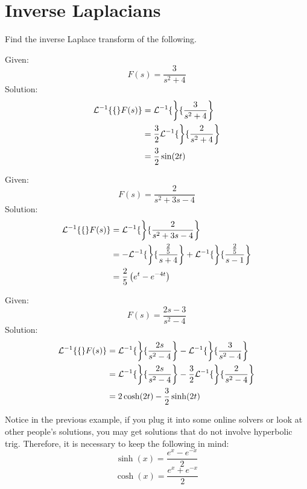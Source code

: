 \documentclass[diffeq.tex]{subfiles}
\begin{document}
\section{Inverse Laplacians}
Find the inverse Laplace transform of the following.
\begin{homework*}[255.1]
    Given:
    \begin{equation}
        F(s) = \frac{3}{s^{2} + 4}
    \end{equation}
    Solution:
    \begin{alignat}{1}
        \mathcal{L}^{-1}\{\{\}F(s)\} &= \mathcal{L}^{-1}\{\left\}\{\frac{3}{s^{2} + 4}\right\}\\
        &= \frac{3}{2}\mathcal{L}^{-1}\{\left\}\{\frac{2}{s^{2} + 4}\right\}\\
        &= \frac{3}{2}\sin(2t)
    \end{alignat}
\end{homework*}
\begin{homework*}[255.3]
    Given:
    \begin{equation}
        F(s) = \frac{2}{s^{2} + 3s - 4}
    \end{equation}
    Solution:
    \begin{alignat}{1}
        \mathcal{L}^{-1}\{\{\}F(s)\} &= \mathcal{L}^{-1}\{\left\}\{\frac{2}{s^{2} + 3s - 4}\right\}\\
        &= -\mathcal{L}^{-1}\{\left\}\{\frac{\frac{2}{5}}{s + 4}\right\} + \mathcal{L}^{-1}\{\left\}\{\frac{\frac{2}{5}}{s - 1}\right\}\\
        &= \frac{2}{5}\left(e^{t}-e^{-4t}\right)
    \end{alignat}
\end{homework*}
\begin{homework*}[255.5]
    Given:
    \begin{equation}
        F(s) = \frac{2s-3}{s^{2} - 4}
    \end{equation}
    Solution:
    \begin{alignat}{1}
        \mathcal{L}^{-1}\{\{\}F(s)\} &= \mathcal{L}^{-1}\{\left\}\{\frac{2s}{s^{2}-4}\right\} - \mathcal{L}^{-1}\{\left\}\{\frac{3}{s^{2} - 4}\right\}\\
        &= \mathcal{L}^{-1}\{\left\}\{\frac{2s}{s^{2}-4}\right\} - \frac{3}{2}\mathcal{L}^{-1}\{\left\}\{\frac{2}{s^{2} - 4}\right\}\\
        &= 2\cosh(2t) - \frac{3}{2}\sinh(2t)
    \end{alignat}
\end{homework*}
\begin{remark}
    Notice in the previous example, if you plug it into some online solvers or look at other people's solutions, you may get solutions that do not involve hyperbolic trig. Therefore, it is necessary to keep the following in mind:
    \begin{equation}
        \sinh(x) = \frac{e^{x} - e^{-x}}{2}
    \end{equation}
    \begin{equation}
        \cosh(x) = \frac{e^{x} + e^{-x}}{2}
    \end{equation}
\end{remark}
\end{document}
